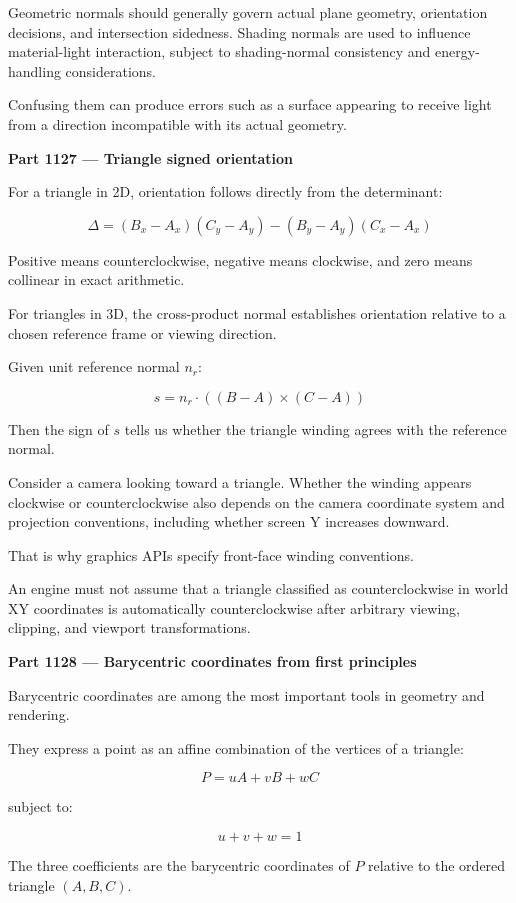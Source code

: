 Geometric normals should generally govern actual plane geometry, orientation decisions, and intersection sidedness. Shading normals are used to influence material-light interaction, subject to shading-normal consistency and energy-handling considerations.

Confusing them can produce errors such as a surface appearing to receive light from a direction incompatible with its actual geometry.

\textbf{Part 1127 --- Triangle signed orientation}

For a triangle in 2D, orientation follows directly from the determinant:

\[
\Delta= (B_x-A_x)(C_y-A_y) - (B_y-A_y)(C_x-A_x)
\]

Positive means counterclockwise, negative means clockwise, and zero means collinear in exact arithmetic.

For triangles in 3D, the cross-product normal establishes orientation relative to a chosen reference frame or viewing direction.

Given unit reference normal \(n_r\):

\[
s=n_r\cdot((B-A)\times(C-A))
\]

Then the sign of \(s\) tells us whether the triangle winding agrees with the reference normal.

Consider a camera looking toward a triangle. Whether the winding appears clockwise or counterclockwise also depends on the camera coordinate system and projection conventions, including whether screen Y increases downward.

That is why graphics APIs specify front-face winding conventions.

An engine must not assume that a triangle classified as counterclockwise in world XY coordinates is automatically counterclockwise after arbitrary viewing, clipping, and viewport transformations.

\textbf{Part 1128 --- Barycentric coordinates from first principles}

Barycentric coordinates are among the most important tools in geometry and rendering.

They express a point as an affine combination of the vertices of a triangle:

\[
\boxed{ P=uA+vB+wC }
\]

subject to:

\[
\boxed{u+v+w=1}
\]

The three coefficients are the barycentric coordinates of \(P\) relative to the ordered triangle \((A,B,C)\).

